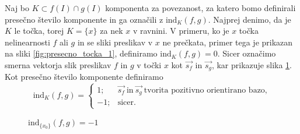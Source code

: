 \documentclass[mat1]{fmfdelo}
\newcommand{\ind}[3][]{\text{ind}_{#1}(#2, #3)}
\begin{document}
Naj bo $K \subset f(I) \cap g(I)$ komponenta za povezanost, za katero bomo definirali presečno število komponente in ga označili z $\ind[K]{f}{g}$. Najprej denimo, da je $K$ le točka, torej $K = \{x\}$ za nek $x$ v ravnini. V primeru, ko je $x$ točka nelinearnosti $f$ ali $g$ in se sliki preslikav v $x$ ne prečkata, primer tega je prikazan na sliki \ref{fig:presecno_tocka_1}, definiramo $\ind[K]{f}{g} = 0.$ Sicer označimo smerna vektorja slik preslikav $f$ in $g$ v točki $x$ kot $\overrightarrow{s_f}$ in $\overrightarrow{s_g}$, kar prikazuje slika \ref{fig:presecno_tocka_2}. Kot presečno število komponente definiramo
\begin{equation*}
\ind[K]{f}{g} = \begin{cases}
1; & \overrightarrow{s_f}\ \text{in}\ \overrightarrow{s_g}\ \text{tvorita pozitivno orientirano bazo,}\\
-1; &\text{sicer}.
\end{cases}
\end{equation*}

\begin{figure}[h!]
\begin{minipage}{0.5\textwidth}
	\centering
	\caption{$\ind[\{x_0\}]{f}{g} = 0$}
	\label{fig:presecno_tocka_1}
\end{minipage}\hfill
\begin{minipage}{0.5\textwidth}
	\centering
	\caption{$\ind[\{x_0\}]{f}{g} = -1$}
	\label{fig:presecno_tocka_2}
\end{minipage}
\end{figure}
\end{document}
